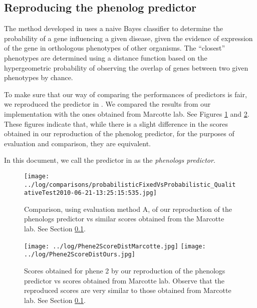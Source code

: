 \documentclass{article}
\begin{document}
\subsection{Reproducing the phenolog predictor}
\label{sec:Reproducing the phenolog predictor}
The method developed in \cite{McGaryOrthologousPhenotypes, McGarySI} uses a naive Bayes classifier to determine the probability of a gene influencing a given disease, given the evidence of expression of the gene in orthologous phenotypes of other organisms. The ``closest'' phenotypes are determined using a distance function based on the hypergeometric probability of observing the overlap of genes between two given phenotypes by chance.

To make sure that our way of comparing the performances of predictors is fair, we reproduced the predictor in \cite{McGaryOrthologousPhenotypes}. We compared the results from our implementation with the ones obtained from Marcotte lab. See Figures \ref{fig:probabilisticFixedVsProbabilistic_QualitativeTest} and \ref{fig:Phene2ScoreDistMarcotte}. These figures indicate that, while there is a slight difference in the scores obtained in our reproduction of the phenolog predictor, for the purposes of evaluation and comparison, they are equivalent. 

In this document, we call the predictor in \cite{McGaryOrthologousPhenotypes} as the \emph{phenologs predictor}.

\begin{figure}[h]
\texttt{[image: ../log/comparisons/probabilisticFixedVsProbabilistic\_QualitativeTest2010-06-21-13:25:15:535.jpg]}
\caption{Comparison, using evaluation method A, of our reproduction of the phenologs predictor vs similar scores obtained from the Marcotte lab. See Section \ref{sec:Reproducing the phenolog predictor}.}
\label{fig:probabilisticFixedVsProbabilistic_QualitativeTest}
\end{figure}

\begin{figure}[h]
\texttt{[image: ../log/Phene2ScoreDistMarcotte.jpg]}
\texttt{[image: ../log/Phene2ScoreDistOurs.jpg]}
\caption{Scores obtained for phene 2 by our reproduction of the phenologs predictor vs scores obtained from Marcotte lab. Observe that the reproduced scores are very similar to those obtained from Marcotte lab. See Section \ref{sec:Reproducing the phenolog predictor}.}
\label{fig:Phene2ScoreDistMarcotte}
\end{figure}
\end{document}
